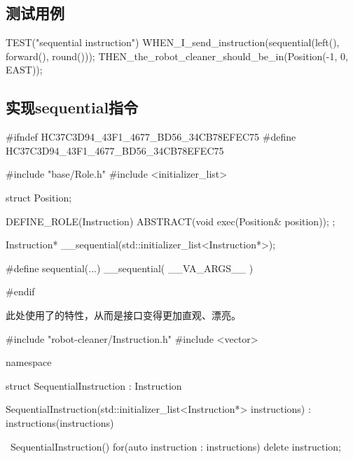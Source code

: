 \begin{content}

\subsection{测试用例}

\begin{leftbar}
\begin{c++}[caption={test/robot-cleaner/TestRobotCleaner.h}]
TEST("sequential instruction")
{
    WHEN_I_send_instruction(sequential(left(), forward(), round()));
    THEN_the_robot_cleaner_should_be_in(Position(-1, 0, EAST));
}
\end{c++}
\end{leftbar}

\subsection{实现sequential指令}

\begin{leftbar}
\begin{c++}[caption={include/robot-cleaner/Instruction.h}]
#ifndef HC37C3D94_43F1_4677_BD56_34CB78EFEC75
#define HC37C3D94_43F1_4677_BD56_34CB78EFEC75

#include "base/Role.h"
#include <initializer_list>

struct Position;

DEFINE_ROLE(Instruction)
{
    ABSTRACT(void exec(Position& position));
};

Instruction* __sequential(std::initializer_list<Instruction*>);

#define sequential(...) __sequential({ __VA_ARGS__ })

#endif
\end{c++}
\end{leftbar}

此处使用了的特性，从而是接口变得更加直观、漂亮。

\begin{leftbar}
\begin{c++}[caption={src/robot-cleaner/Instruction.cpp}]
#include "robot-cleaner/Instruction.h"
#include <vector>
  
namespace
{
    struct SequentialInstruction : Instruction
    {
        SequentialInstruction(std::initializer_list<Instruction*> instructions)
          : instructions(instructions)
        {}

        ~SequentialInstruction()
        {
            for(auto instruction : instructions)
            {
                delete instruction;
            }
        }

}}
\end{c++}
\end{leftbar}
\end{content}
